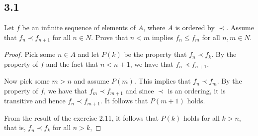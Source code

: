 \subsection*{3.1} Let $f$ be an infinite sequence of elements of $A$, where $A$ is ordered by $\prec$. Assume that $f_n \prec f_{n+1}$ for all $n \in N$. Prove that $n < m$ implies $f_n \leq f_m$ for all $n,m \in N$.

\begin{proof}
Pick some $n \in A$ and let $P(k)$ be the property that $f_n \prec f_k$. By the property of $f$ and the fact that $n < n+1$, we have that $f_n \prec f_{n+1}$.

Now pick some $m > n$ and assume $P(m)$. This implies that $f_n \prec f_m$. By the property of $f$, we have that $f_m \prec f_{m+1}$ and since $\prec$ is an ordering, it is transitive and hence $f_n \prec f_{m+1}$. It follows that $P(m+1)$ holds.

From the result of the exercise 2.11, it follows that $P(k)$ holds for all $k > n$, that is, $f_n \prec f_k$ for all $n > k$,

\end{proof}

